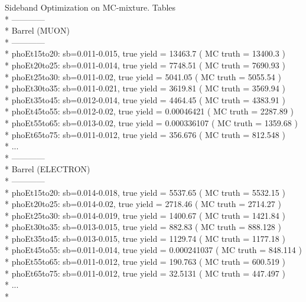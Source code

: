 \documentclass{beamer}
\begin{document}
\begin{frame}{Sideband Optimization on MC-mixture. Tables}\\*
\scriptsize
------------\\*
Barrel (MUON)\\*
------------\\*
phoEt15to20: sb=0.011-0.015, true yield = 13463.7 ( MC truth = 13400.3 ) \\*
phoEt20to25: sb=0.011-0.014, true yield = 7748.51 ( MC truth = 7690.93 ) \\*
phoEt25to30: sb=0.011-0.02, true yield = 5041.05 ( MC truth = 5055.54 ) \\*
phoEt30to35: sb=0.011-0.021, true yield = 3619.81 ( MC truth = 3569.94 ) \\*
phoEt35to45: sb=0.012-0.014, true yield = 4464.45 ( MC truth = 4383.91 ) \\*
phoEt45to55: sb=0.012-0.02, true yield = 0.00046421 ( MC truth = 2287.89 ) \\*
phoEt55to65: sb=0.013-0.02, true yield = 0.000336107 ( MC truth = 1359.68 ) \\*
phoEt65to75: sb=0.011-0.012, true yield = 356.676 ( MC truth = 812.548 ) \\*
...\\*
------------\\*
Barrel (ELECTRON)\\*
------------\\*
phoEt15to20: sb=0.014-0.018, true yield = 5537.65 ( MC truth = 5532.15 ) \\*
phoEt20to25: sb=0.014-0.02, true yield = 2718.46 ( MC truth = 2714.27 ) \\*
phoEt25to30: sb=0.014-0.019, true yield = 1400.67 ( MC truth = 1421.84 ) \\*
phoEt30to35: sb=0.013-0.015, true yield = 882.83 ( MC truth = 888.128 ) \\*
phoEt35to45: sb=0.013-0.015, true yield = 1129.74 ( MC truth = 1177.18 ) \\*
phoEt45to55: sb=0.011-0.014, true yield = 0.000241037 ( MC truth = 848.114 ) \\*
phoEt55to65: sb=0.011-0.012, true yield = 190.763 ( MC truth = 600.519 ) \\*
phoEt65to75: sb=0.011-0.012, true yield = 32.5131 ( MC truth = 447.497 )\\*
...\\*
\end{frame}
\end{document}
